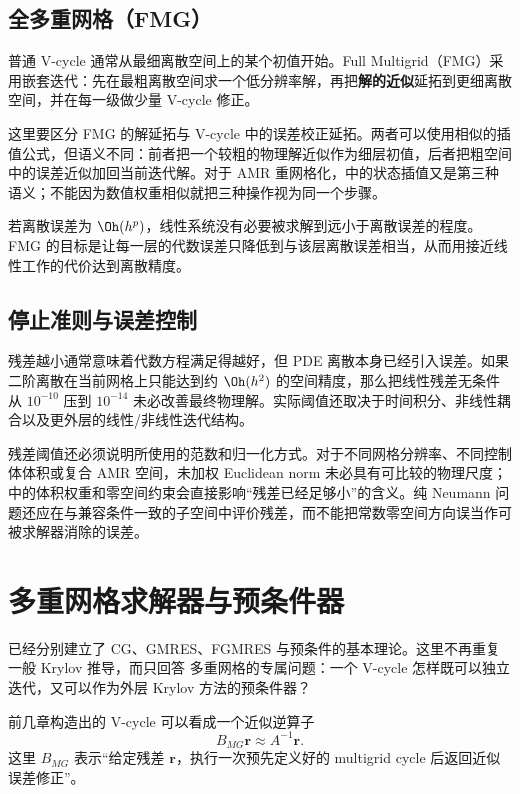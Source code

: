 \subsection{全多重网格（FMG）}

普通 V-cycle 通常从最细离散空间上的某个初值开始。Full Multigrid（FMG）采用嵌套迭代：先在最粗离散空间求一个低分辨率解，再把\textbf{解的近似}延拓到更细离散空间，并在每一级做少量 V-cycle 修正。

这里要区分 FMG 的解延拓与 V-cycle 中的误差校正延拓。两者可以使用相似的插值公式，但语义不同：前者把一个较粗的物理解近似作为细层初值，后者把粗空间中的误差近似加回当前迭代解。对于 AMR 重网格化，中的状态插值又是第三种语义；不能因为数值权重相似就把三种操作视为同一个步骤。

若离散误差为 $\Oh(h^p)$，线性系统没有必要被求解到远小于离散误差的程度。FMG 的目标是让每一层的代数误差只降低到与该层离散误差相当，从而用接近线性工作的代价达到离散精度\cite{brandt1977,briggs2000,trottenberg2001}。

\subsection{停止准则与误差控制}

残差越小通常意味着代数方程满足得越好，但 PDE 离散本身已经引入误差。如果二阶离散在当前网格上只能达到约 $\Oh(h^2)$ 的空间精度，那么把线性残差无条件从 $10^{-10}$ 压到 $10^{-14}$ 未必改善最终物理解。实际阈值还取决于时间积分、非线性耦合以及更外层的线性/非线性迭代结构。

残差阈值还必须说明所使用的范数和归一化方式。对于不同网格分辨率、不同控制体体积或复合 AMR 空间，未加权 Euclidean norm 未必具有可比较的物理尺度；中的体积权重和零空间约束会直接影响“残差已经足够小”的含义。纯 Neumann 问题还应在与兼容条件一致的子空间中评价残差，而不能把常数零空间方向误当作可被求解器消除的误差。

\section{多重网格求解器与预条件器}
\label{sec:mg-preconditioner}

已经分别建立了 CG、GMRES、FGMRES 与预条件的基本理论。这里不再重复一般 Krylov 推导，而只回答 多重网格的专属问题：一个 V-cycle 怎样既可以独立迭代，又可以作为外层 Krylov 方法的预条件器？

前几章构造出的 V-cycle 可以看成一个近似逆算子
\begin{equation}
\boxed{
B_{MG}\bm r
\approx
A^{-1}\bm r.
}
\label{eq:preconditioner-mg-approximate-inverse}
\end{equation}
这里 $B_{MG}$ 表示“给定残差 $\bm r$，执行一次预先定义好的 multigrid cycle 后返回近似误差修正”。


